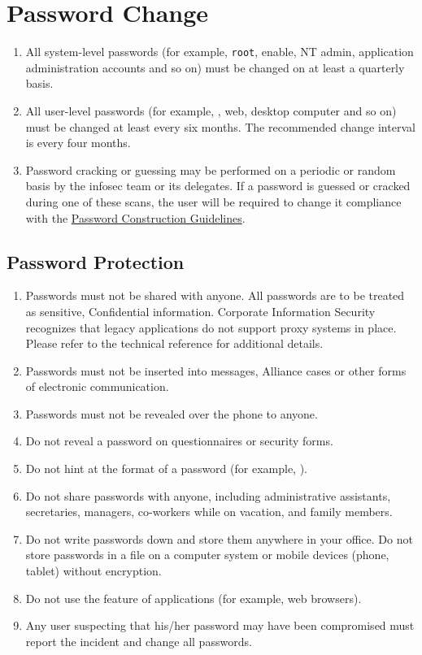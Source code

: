 \section{Password Change}
\begin{enumerate}
\item
All system-level passwords (for example, \texttt{root}, enable, NT admin, application administration accounts\oxford{} and so on) must be changed on at least a quarterly basis.
\item
All user-level passwords (for example, \email{}, web, desktop computer\oxford{} and so on) must be changed at least every six months.  
The recommended change interval is every four months.
\item
Password cracking or guessing may be performed on a periodic or random basis by the \gls{infosec} team or its delegates.  
If a password is guessed or cracked during one of these scans, the user will be required to change it  compliance with the \hyperref[G:PCG]{Password Construction Guidelines}.%
\end{enumerate}
\subsection*{Password Protection}
\begin{enumerate}
\item
Passwords must not be shared with anyone.  
All passwords are to be treated as sensitive, Confidential \CompanyName{} information.  
Corporate Information Security recognizes that legacy applications do not support proxy systems in place.  
Please refer to the technical reference for additional details.
\item
Passwords must not be inserted into \email{} messages, Alliance cases\oxford{} or other forms of electronic communication.
\item
Passwords must not be revealed over the phone to anyone.
\item
Do not reveal a password on questionnaires or security forms.
\item
Do not hint at the format of a password (for example, ).
\item
Do not share \CompanyName{} passwords with anyone, including administrative assistants, secretaries, managers, co-workers while on vacation, and family members.
\item
Do not write passwords down and store them anywhere in your office.  
Do not store passwords in a file on a computer system or mobile devices (phone, tablet) without encryption.
\item
Do not use the  feature of applications (for example, web browsers).
\item
Any user suspecting that his/her password may have been compromised must report the incident and change all passwords.
\end{enumerate}
